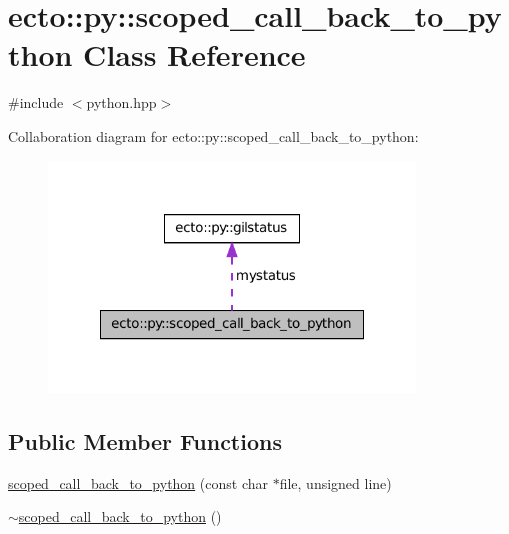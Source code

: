 \hypertarget{classecto_1_1py_1_1scoped__call__back__to__python}{\section{ecto\-:\-:py\-:\-:scoped\-\_\-call\-\_\-back\-\_\-to\-\_\-python \-Class \-Reference}
\label{classecto_1_1py_1_1scoped__call__back__to__python}
}


{\ttfamily \#include $<$python.\-hpp$>$}



\-Collaboration diagram for ecto\-:\-:py\-:\-:scoped\-\_\-call\-\_\-back\-\_\-to\-\_\-python\-:\nopagebreak
\begin{figure}[H]
\begin{center}
\leavevmode
\includegraphics[width=276pt]{classecto_1_1py_1_1scoped__call__back__to__python__coll__graph}
\end{center}
\end{figure}
\subsection*{\-Public \-Member \-Functions}
\begin{DoxyCompactItemize}
\item 
\hyperlink{classecto_1_1py_1_1scoped__call__back__to__python_aa0e62dcba9ee21268b612d0a70849b2d}{scoped\-\_\-call\-\_\-back\-\_\-to\-\_\-python} (const char $\ast$file, unsigned line)
\item 
\hyperlink{classecto_1_1py_1_1scoped__call__back__to__python_a55b49e169de3007a19bb3881d96c38cc}{$\sim$scoped\-\_\-call\-\_\-back\-\_\-to\-\_\-python} ()
\end{DoxyCompactItemize}
